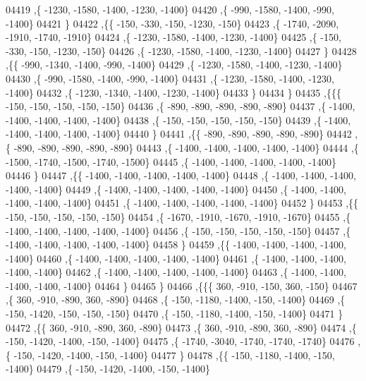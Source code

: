 \begin{DoxyCode}
04419     ,\{ -1230, -1580, -1400, -1230, -1400\}
04420     ,\{  -990, -1580, -1400,  -990, -1400\}
04421     \}
04422    ,\{\{  -150,  -330,  -150, -1230,  -150\}
04423     ,\{ -1740, -2090, -1910, -1740, -1910\}
04424     ,\{ -1230, -1580, -1400, -1230, -1400\}
04425     ,\{  -150,  -330,  -150, -1230,  -150\}
04426     ,\{ -1230, -1580, -1400, -1230, -1400\}
04427     \}
04428    ,\{\{  -990, -1340, -1400,  -990, -1400\}
04429     ,\{ -1230, -1580, -1400, -1230, -1400\}
04430     ,\{  -990, -1580, -1400,  -990, -1400\}
04431     ,\{ -1230, -1580, -1400, -1230, -1400\}
04432     ,\{ -1230, -1340, -1400, -1230, -1400\}
04433     \}
04434    \}
04435   ,\{\{\{  -150,  -150,  -150,  -150,  -150\}
04436     ,\{  -890,  -890,  -890,  -890,  -890\}
04437     ,\{ -1400, -1400, -1400, -1400, -1400\}
04438     ,\{  -150,  -150,  -150,  -150,  -150\}
04439     ,\{ -1400, -1400, -1400, -1400, -1400\}
04440     \}
04441    ,\{\{  -890,  -890,  -890,  -890,  -890\}
04442     ,\{  -890,  -890,  -890,  -890,  -890\}
04443     ,\{ -1400, -1400, -1400, -1400, -1400\}
04444     ,\{ -1500, -1740, -1500, -1740, -1500\}
04445     ,\{ -1400, -1400, -1400, -1400, -1400\}
04446     \}
04447    ,\{\{ -1400, -1400, -1400, -1400, -1400\}
04448     ,\{ -1400, -1400, -1400, -1400, -1400\}
04449     ,\{ -1400, -1400, -1400, -1400, -1400\}
04450     ,\{ -1400, -1400, -1400, -1400, -1400\}
04451     ,\{ -1400, -1400, -1400, -1400, -1400\}
04452     \}
04453    ,\{\{  -150,  -150,  -150,  -150,  -150\}
04454     ,\{ -1670, -1910, -1670, -1910, -1670\}
04455     ,\{ -1400, -1400, -1400, -1400, -1400\}
04456     ,\{  -150,  -150,  -150,  -150,  -150\}
04457     ,\{ -1400, -1400, -1400, -1400, -1400\}
04458     \}
04459    ,\{\{ -1400, -1400, -1400, -1400, -1400\}
04460     ,\{ -1400, -1400, -1400, -1400, -1400\}
04461     ,\{ -1400, -1400, -1400, -1400, -1400\}
04462     ,\{ -1400, -1400, -1400, -1400, -1400\}
04463     ,\{ -1400, -1400, -1400, -1400, -1400\}
04464     \}
04465    \}
04466   ,\{\{\{   360,  -910,  -150,   360,  -150\}
04467     ,\{   360,  -910,  -890,   360,  -890\}
04468     ,\{  -150, -1180, -1400,  -150, -1400\}
04469     ,\{  -150, -1420,  -150,  -150,  -150\}
04470     ,\{  -150, -1180, -1400,  -150, -1400\}
04471     \}
04472    ,\{\{   360,  -910,  -890,   360,  -890\}
04473     ,\{   360,  -910,  -890,   360,  -890\}
04474     ,\{  -150, -1420, -1400,  -150, -1400\}
04475     ,\{ -1740, -3040, -1740, -1740, -1740\}
04476     ,\{  -150, -1420, -1400,  -150, -1400\}
04477     \}
04478    ,\{\{  -150, -1180, -1400,  -150, -1400\}
04479     ,\{  -150, -1420, -1400,  -150, -1400\}

\end{DoxyCode}
